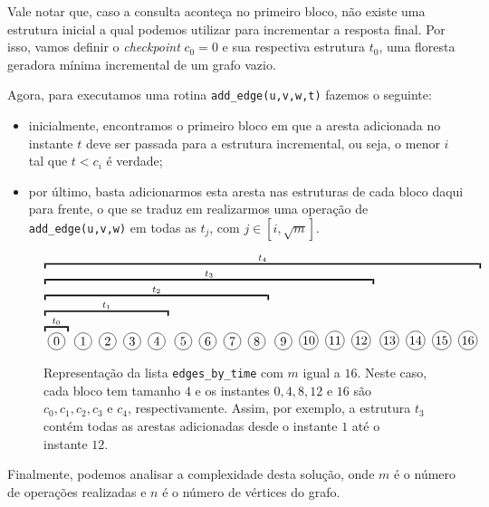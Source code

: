 Vale notar que, caso a consulta aconteça no primeiro bloco, não existe uma estrutura inicial a qual podemos utilizar para incrementar a resposta final. Por isso, vamos definir o \emph{checkpoint} $c_0 = 0$ e sua respectiva estrutura $t_0$, uma floresta geradora mínima incremental de um grafo vazio.

Agora, para executamos uma rotina \texttt{add\_edge(u,v,w,t)} fazemos o seguinte:

\begin{itemize}
    \item inicialmente, encontramos o primeiro bloco em que a aresta adicionada no instante $t$ deve ser passada para a estrutura incremental, ou seja, o menor $i$ tal que $t < c_i$ é verdade;
    \item por último, basta adicionarmos esta aresta nas estruturas de cada bloco daqui para frente, o que se traduz em realizarmos uma operação de \texttt{add\_edge(u,v,w)} em todas as $t_j$, com $j \in [i, \sqrt{m}]$.
\end{itemize}

\begin{figure}
    \centering
    \begin{equation*}
        \overbracket{
            \overbracket{
                \overbracket{
                    \overbracket{
                        \overbracket{
                            \bolinha{\,0\,}
                        }^{t_0}
                        \bolinha{\,1\,}
                        \bolinha{\,2\,}
                        \bolinha{\,3\,}
                        \bolinha{\,4\,}
                    }^{t_1}
                    \bolinha{\,5\,}
                    \bolinha{\,6\,}
                    \bolinha{\,7\,}
                    \bolinha{\,8\,}
                }^{t_2}
                \bolinha{\,9\,}
                \bolinha{10}
                \bolinha{11}
                \bolinha{12}
            }^{t_3}
            \bolinha{13}
            \bolinha{14}
            \bolinha{15}
            \bolinha{16}
        }^{t_4}
    \end{equation*}
    \caption{Representação da lista \texttt{edges\_by\_time} com $m$ igual a $16$. Neste caso, cada bloco tem tamanho $4$ e os instantes $0,4,8,12$ e $16$ são $c_0, c_1, c_2, c_3$ e $c_4$, respectivamente. Assim, por exemplo, a estrutura $t_3$ contém todas as arestas adicionadas desde o instante $1$ até o instante $12$.}
    \label{fig:sqrt-decomp-blocks-m16}
\end{figure}

Finalmente, podemos analisar a complexidade desta solução, onde $m$ é o número de operações realizadas e $n$ é o número de vértices do grafo.

